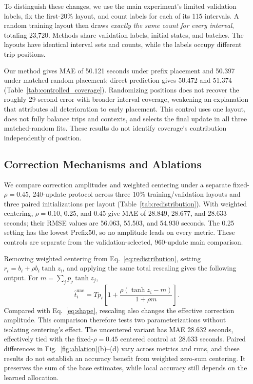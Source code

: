 
To distinguish these changes, we use the main experiment's limited validation labels, fix the first-20\% layout, and count labels for each of its 115 intervals. A random training layout then draws \emph{exactly the same count for every interval}, totaling 23,720. Methods share validation labels, initial states, and batches. The layouts have identical interval sets and counts, while the labels occupy different trip positions.

Our method gives MAE of 50.121 seconds under prefix placement and 50.397 under matched random placement; direct prediction gives 50.472 and 51.374 (Table~\ref{tab:controlled_coverage}). Randomizing positions does not recover the roughly 29-second error with broader interval coverage, weakening an explanation that attributes all deterioration to early placement. This control uses one layout, does not fully balance trips and contexts, and selects the final update in all three matched-random fits. These results do not identify coverage's contribution independently of position.

\subsection{Correction Mechanisms and Ablations}

We compare correction amplitudes and weighted centering under a separate fixed-$\rho=0.45$, 240-update protocol across three 10\% training/validation layouts and three paired initializations per layout (Table~\ref{tab:redistribution}). With weighted centering, $\rho=0.10$, 0.25, and 0.45 give MAE of 28.849, 28.677, and 28.633 seconds; their RMSE values are 56.063, 55.503, and 54.930 seconds. The 0.25 setting has the lowest Prefix50, so no amplitude leads on every metric. These controls are separate from the validation-selected, 960-update main comparison.

Removing weighted centering from Eq.~\eqref{eq:redistribution}, setting $r_i=b_i+\rho b_i\tanh z_i$, and applying the same total rescaling gives the following output. For $m=\sum_jp_j\tanh z_j$,
\begin{equation}
\hat t_i^{\mathrm{unc}}=T p_i\left[1+\frac{\rho(\tanh z_i-m)}{1+\rho m}\right].
\end{equation}
Compared with Eq.~\eqref{eq:shape}, rescaling also changes the effective correction amplitude. This comparison therefore tests two parameterizations without isolating centering's effect. The uncentered variant has MAE 28.632 seconds, effectively tied with the fixed-$\rho=0.45$ centered control at 28.633 seconds. Paired differences in Fig.~\ref{fig:ablation}(b)--(d) vary across metrics and runs, and these results do not establish an accuracy benefit from weighted zero-sum centering. It preserves the sum of the base estimates, while local accuracy still depends on the learned allocation.


